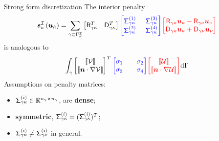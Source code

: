 \documentclass{beamer}
\begin{document}
\begin{frame}{Strong form discretization}
    The interior penalty 
    \vskip -3mm
    \begin{equation*}
    \bm{s}_{\kappa}^{\fnc{I}}\left(\bm{u}_{h}\right)
    = \sum_{\gamma \subset \Gamma_\kappa^\fnc{I}}
    \begin{bmatrix} \Rgk^T & \Dgk^T \end{bmatrix}
    \setlength{\arraycolsep}{7pt}
    {\color{blue}\begin{bmatrix} \Siggk{1} & \Siggk{3} \\ \Siggk{2} & \Siggk{4} \end{bmatrix}}
    {\color{red}\begin{bmatrix} \Rgk\Ukp - \Rgn\Unu \\ \Dgk\Ukp + \Dgn\Unu \end{bmatrix} }
    \end{equation*}
    is analogous to
    \vskip -3mm
    \begin{equation*}
    \int_{\gamma} 
    \begin{bmatrix} \llbracket\mathcal{V} \rrbracket \\ \llbracket \bm{n}\cdot \nabla\mathcal{V}\rrbracket \end{bmatrix}^T
    {\color{blue}\begin{bmatrix}
        \sigma_1 && \sigma_2 \\ \sigma_3 && \sigma_4
        \end{bmatrix}}
    {\color{red}\begin{bmatrix}
        \llbracket\mathcal{U} \rrbracket \\ 
        \llbracket \bm{n}\cdot \nabla\mathcal{U}\rrbracket
        \end{bmatrix}} \mathrm{d} \Gamma
    \end{equation*}
    \vskip 2mm
    Assumptions on penalty matrices:
    \begin{itemize}
        \item $\mathsf{\Sigma}_{\gamma\kappa}^{(i)} \in \mathbb{R}^{n_\gamma\times n_\gamma}$, are \textbf{dense};
        \item \textbf{symmetric}, $\mathsf{\Sigma}_{\gamma\kappa}^{(i)} = (\mathsf{\Sigma}_{\gamma\kappa}^{(i)})^T$;
        \item $\mathsf{\Sigma}_{\gamma\kappa}^{(i)} \ne \mathsf{\Sigma}_{\gamma\nu}^{(i)}$ in general.
    \end{itemize}
\end{frame}
\end{document}

